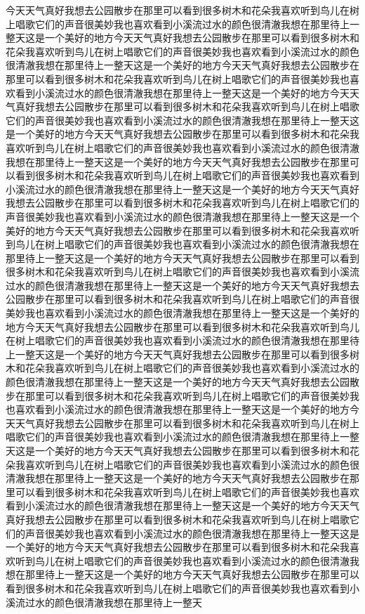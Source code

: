 \documentclass[withoutpreface,bwprint]{cumcmthesis}
\begin{document}
今天天气真好我想去公园散步在那里可以看到很多树木和花朵我喜欢听到鸟儿在树上唱歌它们的声音很美妙我也喜欢看到小溪流过水的颜色很清澈我想在那里待上一整天这是一个美好的地方今天天气真好我想去公园散步在那里可以看到很多树木和花朵我喜欢听到鸟儿在树上唱歌它们的声音很美妙我也喜欢看到小溪流过水的颜色很清澈我想在那里待上一整天这是一个美好的地方今天天气真好我想去公园散步在那里可以看到很多树木和花朵我喜欢听到鸟儿在树上唱歌它们的声音很美妙我也喜欢看到小溪流过水的颜色很清澈我想在那里待上一整天这是一个美好的地方今天天气真好我想去公园散步在那里可以看到很多树木和花朵我喜欢听到鸟儿在树上唱歌它们的声音很美妙我也喜欢看到小溪流过水的颜色很清澈我想在那里待上一整天这是一个美好的地方今天天气真好我想去公园散步在那里可以看到很多树木和花朵我喜欢听到鸟儿在树上唱歌它们的声音很美妙我也喜欢看到小溪流过水的颜色很清澈我想在那里待上一整天这是一个美好的地方今天天气真好我想去公园散步在那里可以看到很多树木和花朵我喜欢听到鸟儿在树上唱歌它们的声音很美妙我也喜欢看到小溪流过水的颜色很清澈我想在那里待上一整天这是一个美好的地方今天天气真好我想去公园散步在那里可以看到很多树木和花朵我喜欢听到鸟儿在树上唱歌它们的声音很美妙我也喜欢看到小溪流过水的颜色很清澈我想在那里待上一整天这是一个美好的地方今天天气真好我想去公园散步在那里可以看到很多树木和花朵我喜欢听到鸟儿在树上唱歌它们的声音很美妙我也喜欢看到小溪流过水的颜色很清澈我想在那里待上一整天这是一个美好的地方今天天气真好我想去公园散步在那里可以看到很多树木和花朵我喜欢听到鸟儿在树上唱歌它们的声音很美妙我也喜欢看到小溪流过水的颜色很清澈我想在那里待上一整天这是一个美好的地方今天天气真好我想去公园散步在那里可以看到很多树木和花朵我喜欢听到鸟儿在树上唱歌它们的声音很美妙我也喜欢看到小溪流过水的颜色很清澈我想在那里待上一整天这是一个美好的地方今天天气真好我想去公园散步在那里可以看到很多树木和花朵我喜欢听到鸟儿在树上唱歌它们的声音很美妙我也喜欢看到小溪流过水的颜色很清澈我想在那里待上一整天这是一个美好的地方今天天气真好我想去公园散步在那里可以看到很多树木和花朵我喜欢听到鸟儿在树上唱歌它们的声音很美妙我也喜欢看到小溪流过水的颜色很清澈我想在那里待上一整天这是一个美好的地方今天天气真好我想去公园散步在那里可以看到很多树木和花朵我喜欢听到鸟儿在树上唱歌它们的声音很美妙我也喜欢看到小溪流过水的颜色很清澈我想在那里待上一整天这是一个美好的地方今天天气真好我想去公园散步在那里可以看到很多树木和花朵我喜欢听到鸟儿在树上唱歌它们的声音很美妙我也喜欢看到小溪流过水的颜色很清澈我想在那里待上一整天这是一个美好的地方今天天气真好我想去公园散步在那里可以看到很多树木和花朵我喜欢听到鸟儿在树上唱歌它们的声音很美妙我也喜欢看到小溪流过水的颜色很清澈我想在那里待上一整天这是一个美好的地方今天天气真好我想去公园散步在那里可以看到很多树木和花朵我喜欢听到鸟儿在树上唱歌它们的声音很美妙我也喜欢看到小溪流过水的颜色很清澈我想在那里待上一整天这是一个美好的地方今天天气真好我想去公园散步在那里可以看到很多树木和花朵我喜欢听到鸟儿在树上唱歌它们的声音很美妙我也喜欢看到小溪流过水的颜色很清澈我想在那里待上一整天这是一个美好的地方今天天气真好我想去公园散步在那里可以看到很多树木和花朵我喜欢听到鸟儿在树上唱歌它们的声音很美妙我也喜欢看到小溪流过水的颜色很清澈我想在那里待上一整天这是一个美好的地方今天天气真好我想去公园散步在那里可以看到很多树木和花朵我喜欢听到鸟儿在树上唱歌它们的声音很美妙我也喜欢看到小溪流过水的颜色很清澈我想在那里待上一整天
\end{document}
